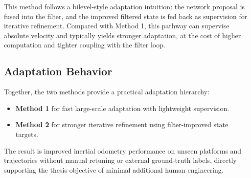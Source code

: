 This method follows a bilevel-style adaptation intuition: the network proposal is fused into the filter, and the improved filtered state is fed back as supervision for iterative refinement.
Compared with Method 1, this pathway can supervise absolute velocity and typically yields stronger adaptation, at the cost of higher computation and tighter coupling with the filter loop.

\subsection{Adaptation Behavior}

Together, the two methods provide a practical adaptation hierarchy:
\begin{itemize}
    \item \textbf{Method 1} for fast large-scale adaptation with lightweight supervision.
    \item \textbf{Method 2} for stronger iterative refinement using filter-improved state targets.
\end{itemize}
The result is improved inertial odometry performance on unseen platforms and trajectories without manual retuning or external ground-truth labels, directly supporting the thesis objective of minimal additional human engineering.